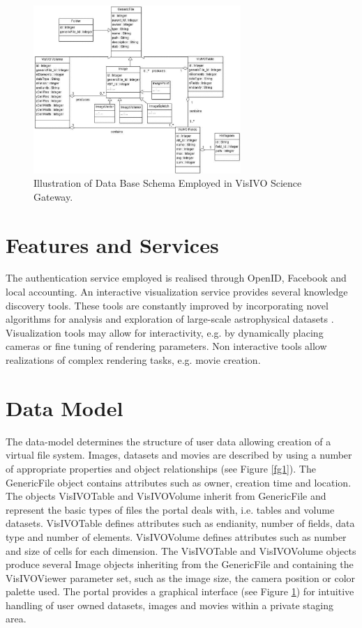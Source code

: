 \documentclass[11pt,twoside]{article}
\begin{document}
\begin{figure}
\begin{center}
\includegraphics[width=0.7\textwidth]{O08_f2.eps}
\caption{Illustration of Data Base Schema Employed in VisIVO Science Gateway.}
\label{fg2}
\end{center}
\end{figure}

\section{Features and Services}
The authentication service employed is realised through OpenID, Facebook and local accounting. An interactive visualization service provides several knowledge discovery tools. These tools are constantly improved by incorporating novel algorithms for analysis and exploration of large-scale astrophysical datasets \citep{hassan2011scientific}. Visualization tools may allow for interactivity, e.g. by dynamically placing cameras or fine tuning of rendering parameters. Non interactive tools allow realizations of complex rendering tasks, e.g. movie creation.   

\section{Data Model}
The data-model determines the structure of user data allowing creation of a virtual file system. Images, datasets and movies are described by using a number of appropriate properties  and object relationships (see Figure \ref{fg1}). The GenericFile object contains attributes such as owner, creation time and location. The objects VisIVOTable and VisIVOVolume inherit from GenericFile and represent the basic types of files the portal deals with, i.e. tables and volume datasets. VisIVOTable defines attributes such as endianity, number of fields, data type and number of elements. VisIVOVolume defines attributes such as number and size of cells for each dimension. The VisIVOTable and VisIVOVolume objects produce several Image objects inheriting from the GenericFile and containing the VisIVOViewer parameter set, such as the image size, the camera position or color palette used. The portal provides a graphical interface (see Figure \ref{fg2}) for intuitive handling of user owned datasets, images and movies within a private staging area.
\end{document}
